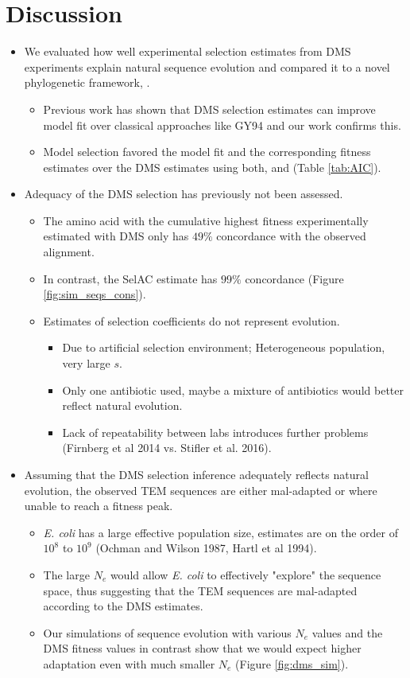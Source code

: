 \documentclass[12pt]{article}
\begin{document}
\section*{Discussion}
\begin{itemize}
	\item We evaluated how well experimental selection estimates from DMS experiments explain natural sequence evolution and compared it to a novel phylogenetic framework, \selac.
	\begin{itemize}
		\item Previous work has shown that DMS selection estimates can improve model fit over classical approaches like GY94 and our work confirms this.
		\item Model selection favored the \selac model fit and the corresponding fitness estimates over the DMS estimates using both, \selacDMS and \phydms (Table \ref{tab:AIC}).
	\end{itemize}

	\item Adequacy of the DMS selection has previously not been assessed.
	\begin{itemize}	
		\item The amino acid with the cumulative highest fitness experimentally estimated with DMS only has $49 \%$ concordance with the observed alignment.
		\item In contrast, the SelAC estimate has $99 \%$ concordance (Figure \ref{fig:sim_seqs_cons}). 
		\item Estimates of selection coefficients do not represent evolution.
 		\begin{itemize}
			\item Due to artificial selection environment; Heterogeneous population, very large $s$. 
			\item Only one antibiotic used, maybe a mixture of antibiotics would better reflect natural evolution.
			\item Lack of repeatability between labs introduces further problems (Firnberg et al 2014 vs. Stifler et al. 2016).
		\end{itemize}
	\end{itemize}

	\item Assuming that the DMS selection inference adequately reflects natural evolution, the observed TEM sequences are either mal-adapted or where unable to reach a fitness peak.
	\begin{itemize}
		\item \textit{E. coli} has a large effective population size, estimates are on the order of $10^8$ to $10^9$ (Ochman and Wilson 1987, Hartl et al 1994).
		\item The large $N_e$ would allow \textit{E. coli} to effectively "explore" the sequence space, thus suggesting that the TEM sequences are mal-adapted according to the DMS estimates.
		\item Our simulations of sequence evolution with various $N_e$ values and the DMS fitness values in contrast show that we would expect higher adaptation even with much smaller $N_e$ (Figure \ref{fig:dms_sim}).
	\end{itemize}


\end{itemize}
\end{document}
